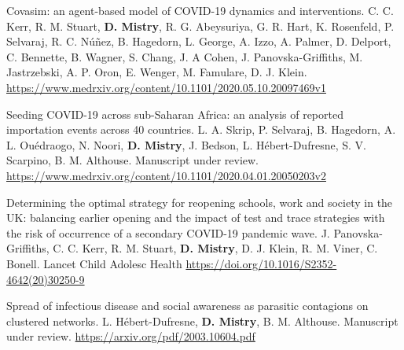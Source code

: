 \begin{cventries}
  \cvpublicationentry
    {Covasim: an agent-based model of COVID-19 dynamics and interventions.} %
    {C. C. Kerr, R. M. Stuart, \textbf{D. Mistry}, R. G. Abeysuriya, G. R. Hart, K. Rosenfeld, P. Selvaraj, R. C. Núñez, B. Hagedorn, L. George, A. Izzo, A. Palmer, D. Delport, C. Bennette, B. Wagner, S. Chang, J. A Cohen, J. Panovska-Griffiths, M. Jastrzebski, A. P. Oron, E. Wenger, M. Famulare, D. J. Klein.} %
    {} %
    {} %
    {} %
    {} %
    {} %
    {} %
    {\href{https://www.medrxiv.org/content/10.1101/2020.05.10.20097469v1}{https://www.medrxiv.org/content/10.1101/2020.05.10.20097469v1}} %
    \vspace{1.5mm}

  \cvpublicationentry
    {Seeding COVID-19 across sub-Saharan Africa: an analysis of reported importation events across 40 countries.} %
    {L. A. Skrip, P. Selvaraj, B. Hagedorn, A. L. Ouédraogo, N. Noori, \textbf{D. Mistry}, J. Bedson, L. Hébert-Dufresne, S. V. Scarpino, B. M. Althouse.} %
    {} %
    {} %
    {} %
    {} %
    {} %
    {Manuscript under review.} %
    {\href{https://www.medrxiv.org/content/10.1101/2020.04.01.20050203v2}{https://www.medrxiv.org/content/10.1101/2020.04.01.20050203v2}} %
    \vspace{1.5mm}

  \cvpublicationentry
    {Determining the optimal strategy for reopening schools, work and society in the UK: balancing earlier opening and the impact of test and trace strategies with the risk of occurrence of a secondary COVID-19 pandemic wave.} %
    {J. Panovska-Griffiths, C. C. Kerr, R. M. Stuart, \textbf{D. Mistry}, D. J. Klein, R. M. Viner, C. Bonell.} %
    {Lancet Child Adolesc Health} %
    {} %
    {} %
    {} %
    {} %
    {} %
    {\href{https://doi.org/10.1016/S2352-4642(20)30250-9}{https://doi.org/10.1016/S2352-4642(20)30250-9}} %
    \vspace{1.5mm}

  \cvpublicationentry
    {Spread of infectious disease and social awareness as parasitic contagions on clustered networks.} %
    {L. Hébert-Dufresne, \textbf{D. Mistry}, B. M. Althouse.} %
    {} %
    {} %
    {} %
    {} %
    {} %
    {Manuscript under review.} %
    {\href{https://arxiv.org/pdf/2003.10604.pdf}{https://arxiv.org/pdf/2003.10604.pdf}} %
    \vspace{1.5mm}


\end{cventries}
